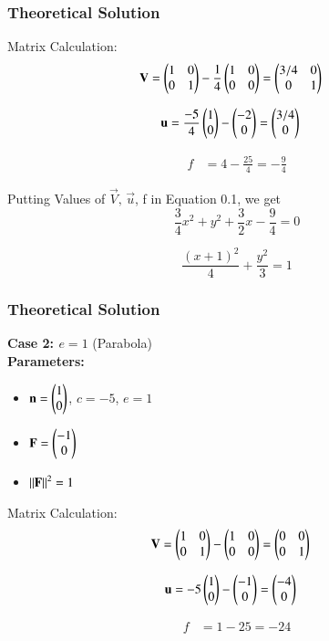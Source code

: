 \documentclass{beamer}
\begin{document}
\begin{frame}[fragile]
    \frametitle{Theoretical Solution}
Matrix Calculation:
\begin{align}
\mathbf{V} &= \begin{pmatrix}1 & 0 \\ 0 & 1\end{pmatrix} - \frac{1}{4}\begin{pmatrix}1 & 0 \\ 0 & 0\end{pmatrix} = \begin{pmatrix}3/4 & 0 \\ 0 & 1\end{pmatrix}
\end{align}

\begin{align}
\mathbf{u} &= \frac{-5}{4}\begin{pmatrix}1 \\ 0\end{pmatrix} - \begin{pmatrix}-2 \\ 0\end{pmatrix} = \begin{pmatrix}3/4 \\ 0\end{pmatrix}
\end{align}

\begin{align}
f &= 4 - \frac{25}{4} = -\frac{9}{4}
\end{align}

Putting Values of $\vec{V}, \, \vec{u}$, f in Equation 0.1, we get
\begin{equation}
\frac{3}{4}x^2 + y^2 + \frac{3}{2}x - \frac{9}{4} = 0
\end{equation}

\begin{equation}
    \boxed{\dfrac{(x+1)^2}{4} + \dfrac{y^2}{3} = 1}
\end{equation}
\end{frame}



\begin{frame}[fragile]
    \frametitle{Theoretical Solution}
\textbf{Case 2: $e = 1$} (Parabola)\\
\textbf{Parameters:}
\begin{itemize}
\item $\mathbf{n} = \begin{pmatrix}1 \\ 0\end{pmatrix}$, $c = -5$, $e = 1$
\item $\mathbf{F} = \begin{pmatrix}-1 \\ 0\end{pmatrix}$
\item $\left\lVert\mathbf{F}\right\rVert^2 = 1$
\end{itemize}

Matrix Calculation:
\begin{align}
\mathbf{V} &= \begin{pmatrix}1 & 0 \\ 0 & 1\end{pmatrix} - \begin{pmatrix}1 & 0 \\ 0 & 0\end{pmatrix} = \begin{pmatrix}0 & 0 \\ 0 & 1\end{pmatrix}
\end{align}

\begin{align}
\mathbf{u} &= -5\begin{pmatrix}1 \\ 0\end{pmatrix} - \begin{pmatrix}-1 \\ 0\end{pmatrix} = \begin{pmatrix}-4 \\ 0\end{pmatrix}
\end{align}

\begin{align}
f &= 1 - 25 = -24
\end{align}
\end{frame}
\end{document}
